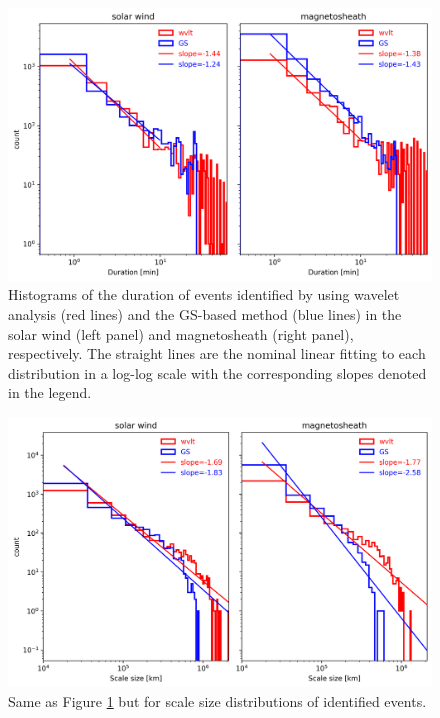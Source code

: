 \begin{figure}
    \centering
    \includegraphics[width=\textwidth]{Figures/Histograms/histogram_duration.png}
    \caption[Histograms of duration for identified events]{Histograms of the duration of events identified by using wavelet analysis (red lines) and the GS-based method (blue lines) in the solar wind (left panel) and magnetosheath (right panel), respectively. The straight lines are the nominal linear fitting to each distribution in a log-log scale with the corresponding slopes denoted in the legend.}
    \label{fig:histogram-duration}
\end{figure}

\begin{figure}
    \centering
    \includegraphics[width=\textwidth]{Figures/Histograms/histogram_scalesize.png}
    \caption[Histograms of scale size for identified events]{Same as Figure \ref{fig:histogram-duration} but for scale size distributions of identified events.}
    \label{fig:histogram-scalesize}
\end{figure}

